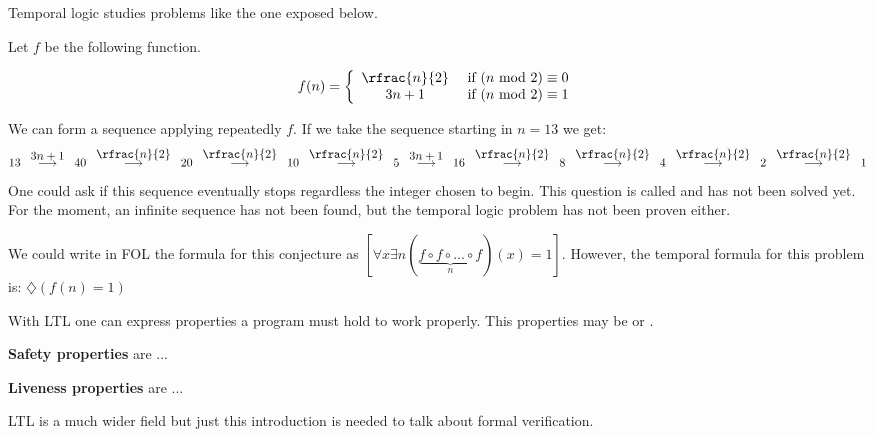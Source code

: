 \begin{example}
Temporal logic studies problems like the one exposed below.

\label{Collatz:conjecture}

Let $f$ be the following function.

\[
f(n) = \left\{
	\begin{array}{cc}
		\rfrac{n}{2} & \text{ if } (n\text{ mod } 2) \equiv 0\\
		3n+1 & \text{ if } (n\text{ mod } 2) \equiv 1
	\end{array}
\right.
\]

We can form a sequence applying repeatedly $f$. If we take the sequence starting in $n=13$ we get:
%
\[ 
	13 \overset{\displaystyle\;\; 3n+1\;\;}{\longrightarrow}
	40 \overset{\displaystyle\;\;\rfrac{n}{2}\;\;}{\longrightarrow}
	20 \overset{\displaystyle\;\;\rfrac{n}{2}\;\;}{\longrightarrow}
	10 \overset{\displaystyle\;\;\rfrac{n}{2}\;\;}{\longrightarrow}
	5 \overset{\displaystyle\;\; 3n+1\;\;}{\longrightarrow}
	16 \overset{\displaystyle\;\;\rfrac{n}{2}\;\;}{\longrightarrow}
	8 \overset{\displaystyle\;\;\rfrac{n}{2}\;\;}{\longrightarrow}
	4 \overset{\displaystyle\;\;\rfrac{n}{2}\;\;}{\longrightarrow}
	2 \overset{\displaystyle\;\;\rfrac{n}{2}\;\;}{\longrightarrow}
	1
\]
%
One could ask if this sequence eventually stops regardless the integer chosen to begin. This question is called  and has not been solved yet. 
%
For the moment, an infinite sequence has not been found, but the temporal logic problem has not been proven either.
%

We could write in \gls{FOL} the formula for this conjecture as $[ \forall x \exists n (\underbrace{f \circ f \circ  ... \circ f}_{n})(x) = 1]$. However, the temporal formula for this problem is: $\diamondsuit \left(f(n) = 1\right)$
\end{example}


With \gls{LTL} one can express properties a program must hold to work properly. 
%
This properties may be  or .


\textbf{Safety properties} are ... 


\textbf{Liveness properties} are ... 


\gls{LTL} is a much wider field but just this introduction is needed to talk about formal verification.
